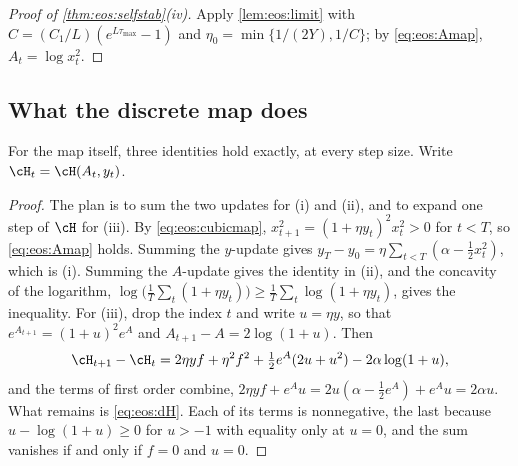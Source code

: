 \begin{refsection}
\begin{proof}[Proof of \cref{thm:eos:selfstab}(iv)]
Apply \cref{lem:eos:limit} with $C=(C_1/L)(e^{L\tau_{\max}}-1)$ and $\eta_0=\min\{1/(2Y),1/C\}$; by \eqref{eq:eos:Amap}, $A_t=\log x_t^2$.
\end{proof}

\subsection{What the discrete map does}

For the map itself, three identities hold exactly, at every step size. Write $\cH_t=\cH(A_t,y_t)$.


\begin{proof}
The plan is to sum the two updates for (i) and (ii), and to expand one step of $\cH$ for (iii). By \eqref{eq:eos:cubicmap}, $x_{t+1}^2=(1+\eta y_t)^2x_t^2>0$ for $t<T$, so \eqref{eq:eos:Amap} holds. Summing the $y$-update gives $y_T-y_0=\eta\sum_{t<T}(\alpha-\frac12x_t^2)$, which is (i). Summing the $A$-update gives the identity in (ii), and the concavity of the logarithm, $\log\bigl(\frac1T\sum_t(1+\eta y_t)\bigr)\ge\frac1T\sum_t\log(1+\eta y_t)$, gives the inequality. For (iii), drop the index $t$ and write $u=\eta y$, so that $e^{A_{t+1}}=(1+u)^2e^A$ and $A_{t+1}-A=2\log(1+u)$. Then
\[
  \cH_{t+1}-\cH_t=2\eta yf+\eta^2f^2+\tfrac12e^A(2u+u^2)-2\alpha\log(1+u),
\]
and the terms of first order combine, $2\eta yf+e^Au=2u(\alpha-\frac12e^A)+e^Au=2\alpha u$. What remains is \eqref{eq:eos:dH}. Each of its terms is nonnegative, the last because $u-\log(1+u)\ge0$ for $u>-1$ with equality only at $u=0$, and the sum vanishes if and only if $f=0$ and $u=0$.
\end{proof}


\end{refsection}
